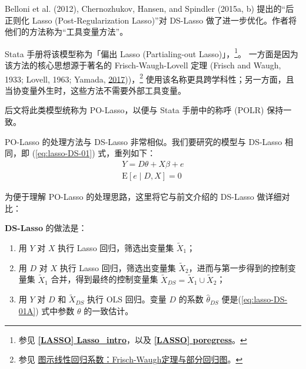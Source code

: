 


Belloni et al. (2012), Chernozhukov, Hansen, and Spindler (2015a, b) 提出的“后正则化 Lasso (Post-Regularization Lasso)”对 DS-Lasso 做了进一步优化。作者将他们的方法称为“工具变量方法”。

Stata 手册将该模型称为「偏出 Lasso (Partialing-out Lasso)」，\footnote{%
   参见 \href{https://www.stata.com/manuals/lassoLasso_intro.pdf}{\bfseries{[\MakeUppercase{lasso}] Lasso\_intro}}，以及 \href{https://www.stata.com/manuals/lassoporegress.pdf}{\bfseries{[\MakeUppercase{lasso}] poregress}}。}。
一方面是因为该方法的核心思想源于著名的 Frisch-Waugh-Lovell 定理 (Frisch and  Waugh, 1933; Lovell, 1963; Yamada, \href{http://dx.doi.org/10.1080/03610926.2016.1252403}{2017}))，\footnote{%
   参见 \href{https://www.lianxh.cn/news/e346db1a68211.html}{图示线性回归系数：Frisch-Waugh定理与部分回归图}。}
使用该名称更具跨学科性；另一方面，且当协变量外生时，这些方法不需要外部工具变量。

后文将此类模型统称为 PO-Lasso，以便与 Stata 手册中的称呼 (POLR) 保持一致。 

PO-Lasso 的处理方法与 DS-Lasso 非常相似。我们要研究的模型与 DS-Lasso 相同，即 (\ref{eq:lasso-DS-01}) 式，重列如下：
\begin{equation}\label{eq:lasso-DS-01A}
\begin{aligned}%
Y =D \theta + X \beta + e \\
\mathrm{E}[e \mid D, X] =0
\end{aligned}
\end{equation}

为便于理解 PO-Lasso 的处理思路，这里将它与前文介绍的 DS-Lasso 做详细对比：

\vspace{5pt}
\textbf{DS-Lasso} 的做法是：

\begin{enumerate}
\item 用 $Y$ 对 $X$ 执行 Lasso 回归，筛选出变量集 $\widetilde{X}_1$；
\item 用 $D$ 对 $X$ 执行 Lasso 回归，筛选出变量集 $\widetilde{X}_2$，进而与第一步得到的控制变量集 $\widetilde{X}_1$ 合并，得到最终的控制变量集 $\widetilde{X}_{DS} = \widetilde{X}_1 \cup \widetilde{X}_2$；
\item 用 $Y$ 对 $D$ 和 $\widetilde{X}_{DS}$ 执行 OLS 回归。变量 $D$ 的系数 $\widehat{\theta}_{DS}$ 便是(\ref{eq:lasso-DS-01A}) 式中参数 $\theta$ 的一致估计。
\end{enumerate}

